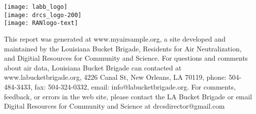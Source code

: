 \documentclass{article}
\newlength\acklength
\newlength\logowidth
\newcommand{\highlightbox}[1]{\colorbox{salmon}{\parbox{\linewidth}{#1}}}
\begin{document}
\newcommand{\standardssection}{
\section*{Sample screening levels}

\highlightbox{Some government agencies have developed standards and screening levels for
toxic chemicals in the air based on health information about the chemicals.
There is no information available for some toxic chemicals. The agencies are
listed below, with a brief description of the methods used in establishing their
levels. States may not be required to adhere to national standards.}

\begin{itemize}
\subst{standardblurbs}
\end{itemize}

}

     \vfill
     \parbox{\logowidth}{
       \texttt{[image: labb\_logo]}\\
       \vskip 0.1in
       \texttt{[image: drcs\_logo-200]}\\
       \vskip 0.1in
       \texttt{[image: RANlogo-text]}
     }
     \setlength\acklength{\textwidth}
     \addtolength\acklength{-\logowidth}
     \addtolength\acklength{-0.7in}
     \hskip 0.5in
     \parbox{\acklength}{
       \sloppy
       This report was generated at www.myairsample.org, a site
       \linebreak
       developed and maintained by the Louisiana Bucket Brigade,
       \linebreak
       Residents for Air Neutralization, and Digitial Resources for
       \linebreak
       Community and Science.  For questions and comments about air
       data, Louisiana Bucket Brigade can contacted at
       www.labucketbrigade.org, 4226 Canal St, New Orleans, LA 70119,
       phone: 504-484-3433, fax: 504-324-0332, email:
       info@labucketbrigade.org.  For comments, feedback, or errors in
       the web site, please contact the LA Bucket Brigade or email
       Digital Resources for Community and Science at
       drcsdirector@gmail.com
     }

\thispagestyle{empty}


\end{document}
